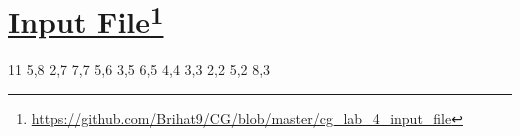 \documentclass[a4paper,12pt]{article}
\begin{document}
  \section*{\textbf{\underline{Input File}}\footnote{\url{https://github.com/Brihat9/CG/blob/master/cg_lab_4_input_file}}}
  \begin{spacing}{1}
    \begin{footnotesize}
      \begin{spverbatim}
11
5,8 2,7 7,7 5,6 3,5 6,5 4,4 3,3 2,2 5,2 8,3
      \end{spverbatim}
    \end{footnotesize}
  \end{spacing}
\end{document}
